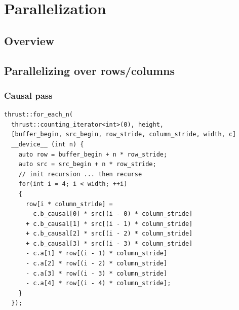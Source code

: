 \documentclass{beamer}
\begin{document}
\section{Parallelization}
\subsection{Overview}

\subsection{Parallelizing over rows/columns}
\begin{frame}[fragile]
\frametitle{Causal pass}
  \begin{lstlisting}[basicstyle=\tiny]
thrust::for_each_n(
  thrust::counting_iterator<int>(0), height,
  [buffer_begin, src_begin, row_stride, column_stride, width, c]
  __device__ (int n) {
    auto row = buffer_begin + n * row_stride;
    auto src = src_begin + n * row_stride;
    // init recursion ... then recurse
    for(int i = 4; i < width; ++i)
    {
      row[i * column_stride] =
        c.b_causal[0] * src[(i - 0) * column_stride]
      + c.b_causal[1] * src[(i - 1) * column_stride]
      + c.b_causal[2] * src[(i - 2) * column_stride]
      + c.b_causal[3] * src[(i - 3) * column_stride]
      - c.a[1] * row[(i - 1) * column_stride]
      - c.a[2] * row[(i - 2) * column_stride]
      - c.a[3] * row[(i - 3) * column_stride]
      - c.a[4] * row[(i - 4) * column_stride];
    }
  });
  \end{lstlisting}
\end{frame}
\end{document}
